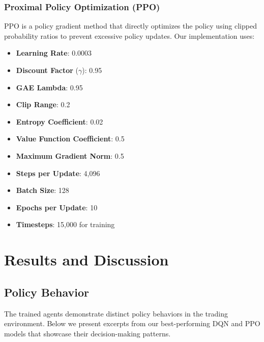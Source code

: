\documentclass[11pt]{article}
\begin{document}
\subsubsection{Proximal Policy Optimization (PPO)}
PPO is a policy gradient method that directly optimizes the policy using clipped probability ratios to prevent excessive policy updates. Our implementation uses:

\begin{itemize}
  \item \textbf{Learning Rate}: 0.0003
  \item \textbf{Discount Factor} (\(\gamma\)): 0.95
  \item \textbf{GAE Lambda}: 0.95
  \item \textbf{Clip Range}: 0.2
  \item \textbf{Entropy Coefficient}: 0.02
  \item \textbf{Value Function Coefficient}: 0.5
  \item \textbf{Maximum Gradient Norm}: 0.5
  \item \textbf{Steps per Update}: 4,096
  \item \textbf{Batch Size}: 128
  \item \textbf{Epochs per Update}: 10
  \item \textbf{Timesteps}: 15,000 for training
\end{itemize}

\section{Results and Discussion}

\subsection{Policy Behavior}
The trained agents demonstrate distinct policy behaviors in the trading environment. Below we present excerpts from our best-performing DQN and PPO models that showcase their decision-making patterns.
\end{document}
